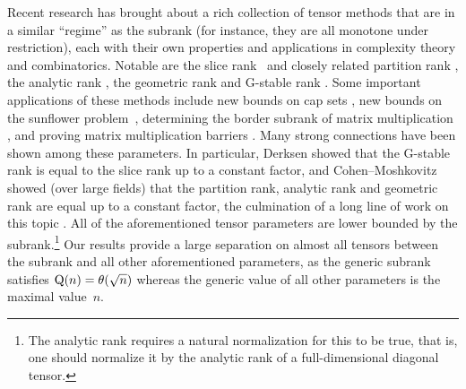 \documentclass[10pt,a4paper]{article}
\theoremstyle{definition}
\theoremstyle{remark}
\newcommand{\gensubrank}{{\rm Q}}
\begin{document}
Recent research has brought about a rich collection of tensor methods that are in a similar ``regime'' as the subrank (for instance, they are all monotone under restriction), each with their own properties and applications in complexity theory and combinatorics. Notable are the slice rank~\cite{tao} and closely related partition rank \cite{naslund2017multi}, the analytic rank \cite{MR2773103,lovett2019analytic,bhrushundi2018multilinear}, the geometric rank \cite{DBLP:conf/coco/KoppartyMZ20, geng2021geometry} and G-stable rank \cite{derksen2020gstable}. Some important applications of these methods include new bounds on cap sets \cite{tao,MR3583358}, new bounds on the sunflower problem~\cite{MR3668469}, determining the border subrank of matrix multiplication \cite{DBLP:conf/coco/KoppartyMZ20}, and proving matrix multiplication barriers \cite{DBLP:journals/corr/BlasiakCCGU16,DBLP:conf/coco/Alman19,DBLP:conf/coco/ChristandlVZ19}. Many strong connections have been shown among these parameters. In particular, Derksen \cite{derksen2020gstable} showed that the G-stable rank is equal to the slice rank up to a constant factor, and Cohen--Moshkovitz \cite{DBLP:conf/stoc/CohenM21,cohen2021partition} showed (over large fields) that the partition rank, analytic rank and geometric rank are equal up to a constant factor, the culmination of a long line of work on this topic \cite{DBLP:journals/cdm/GreenT09,DBLP:conf/focs/KaufmanL08,bhowmick2015bias,janzer2018low,janzer2019polynomial,milicevic2019polynomial}.
All of the aforementioned tensor parameters are lower bounded by the subrank.\footnote{The analytic rank requires a natural normalization for this to be true, that is, one should normalize it by the analytic rank of a full-dimensional diagonal tensor.} Our results provide a large separation on almost all tensors between the subrank and all other aforementioned parameters, as the generic subrank satisfies $\gensubrank(n) = \theta(\sqrt{n})$ whereas the generic value of all other parameters is the maximal value~$n$.
\end{document}
